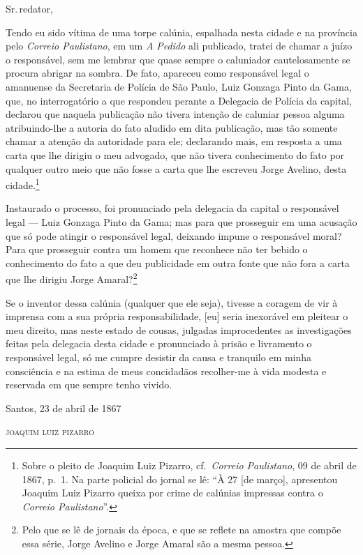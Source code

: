 Sr.\,redator,

Tendo eu sido vítima de uma torpe calúnia, espalhada nesta cidade e na
província pelo \emph{Correio Paulistano}, em um \emph{A Pedido} ali
publicado, tratei de chamar a juízo o responsável, sem me lembrar que
quase sempre o caluniador cautelosamente se procura abrigar na sombra.
De fato, apareceu como responsável legal o amanuense da Secretaria de
Polícia de São Paulo, Luiz Gonzaga Pinto da Gama, que, no interrogatório
a que respondeu perante a Delegacia de Polícia da capital, declarou que
naquela publicação não tivera intenção de caluniar pessoa alguma
atribuindo-lhe a autoria do fato aludido em dita publicação, mas tão
somente chamar a atenção da autoridade para ele; declarando mais, em
resposta a uma carta que lhe dirigiu o meu advogado, que não tivera
conhecimento do fato por qualquer outro meio que não fosse a carta que
lhe escreveu Jorge Avelino, desta cidade.\footnote{ Sobre o pleito de
  Joaquim Luiz Pizarro, cf.~\emph{Correio Paulistano}, 09 de abril de 1867, p.~1.
  Na parte policial do jornal se lê: ``À 27 {[}de março{]}, apresentou
  Joaquim Luiz Pizarro queixa por crime de calúnias impressas contra o
  \emph{Correio Paulistano}''.}

Instaurado o processo, foi pronunciado pela delegacia da capital o
responsável legal --- Luiz Gonzaga Pinto da Gama; mas para que
prosseguir em uma acusação que só pode atingir o responsável legal,
deixando impune o responsável moral? Para que prosseguir contra um homem
que reconhece não ter bebido o conhecimento do fato a que deu
publicidade em outra fonte que não fora a carta que lhe dirigiu Jorge
Amaral?\footnote{ Pelo que se lê de jornais da época, e que se
  reflete na amostra que compõe essa série, Jorge Avelino e Jorge Amaral
  são a mesma pessoa.}

Se o inventor dessa calúnia (qualquer que ele seja), tivesse a coragem
de vir à imprensa com a sua própria responsabilidade, {[}eu{]} seria
inexorável em pleitear o meu direito, mas neste estado de cousas,
julgadas improcedentes as investigações feitas pela delegacia desta
cidade e pronunciado à prisão e livramento o responsável legal, só me
cumpre desistir da causa e tranquilo em minha consciência e na estima de
meus concidadãos recolher-me à vida modesta e reservada em que sempre
tenho vivido.

\begin{flushright}
Santos, 23 de abril de 1867

\textsc{joaquim luiz pizarro}
\end{flushright}


